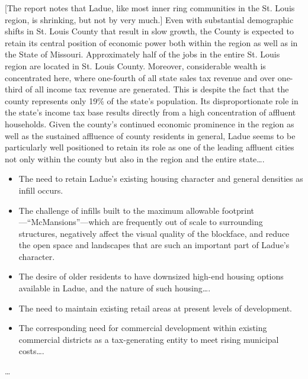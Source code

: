 [The report notes that Ladue, like most inner ring communities in the St. Louis
region, is shrinking, but not by very much.] Even with substantial demographic
shifts in St. Louis County that result in slow growth, the County is expected to
retain its central position of economic power both within the region as well as
in the State of Missouri. Approximately half of the jobs in the entire St. Louis
region are located in St. Louis County. Moreover, considerable wealth is
concentrated here, where one-fourth of all state sales tax revenue and over
one-third of all income tax revenue are generated. This is despite the fact that
the county represents only 19\% of the state's population. Its disproportionate
role in the state's income tax base results directly from a high concentration
of affluent households. Given the county's continued economic prominence in the
region as well as the sustained affluence of county residents in general, Ladue
seems to be particularly well positioned to retain its role as one of the
leading affluent cities not only within the county but also in the region and
the entire state\ldots .


\begin{itemize}
\item The need to retain Ladue's existing housing character and general
densities as infill occurs.
\item The challenge of infills built to the maximum allowable
footprint---``McMansions''---which are frequently out of scale to surrounding
structures, negatively affect the visual quality of the blockface, and reduce
the open space and landscapes that are such an important part of Ladue's
character.
\item The desire of older residents to have downsized high-end housing options
available in Ladue, and the nature of such housing\ldots .
\item The need to maintain existing retail areas at present levels of
development.
\item The corresponding need for commercial development within existing
commercial districts as a tax-generating entity to meet rising municipal
costs\ldots .
\end{itemize}



\ldots


